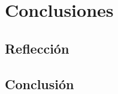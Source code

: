 \chapter{Conclusiones}\label{cap:capitulo6}
\section{Reflección}\label{seccion:reflection}


\section{Conclusión}\label{seccion:conclusion}

